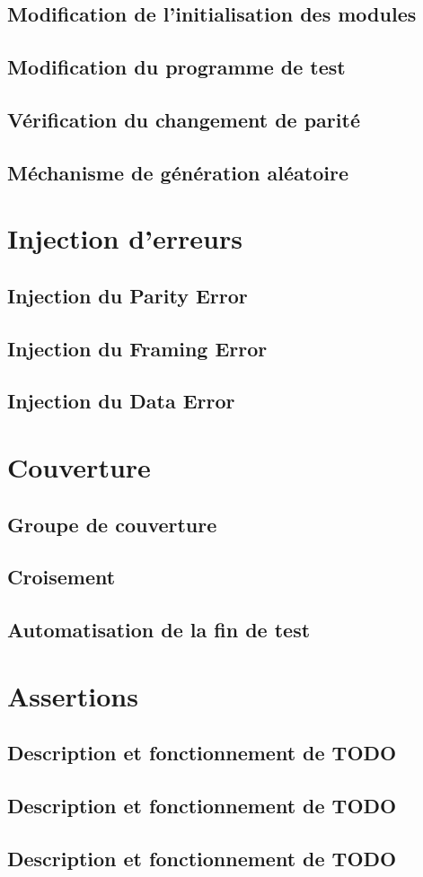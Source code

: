 \documentclass[12pt, titlepage]{article}
\begin{document}
    \subsection{Modification de l'initialisation des modules} \lipsum[2]
    \subsection{Modification du programme de test} \lipsum[2]
    \subsection{Vérification du changement de parité} \lipsum[2]
    \subsection{Méchanisme de génération aléatoire} \lipsum[2]

\section{Injection d'erreurs} 
    \subsection{Injection du Parity Error} \lipsum[3]
    \subsection{Injection du Framing Error} \lipsum[3]
    \subsection{Injection du Data Error} \lipsum[3]

\section{Couverture}
    \subsection{Groupe de couverture} \lipsum[4]
    \subsection{Croisement} \lipsum[4]
    \subsection{Automatisation de la fin de test} \lipsum[4]

\section{Assertions}
    \subsection{Description et fonctionnement de TODO } \lipsum[5]
    \subsection{Description et fonctionnement de TODO } \lipsum[5]
    \subsection{Description et fonctionnement de TODO } \lipsum[5]
\end{document}
